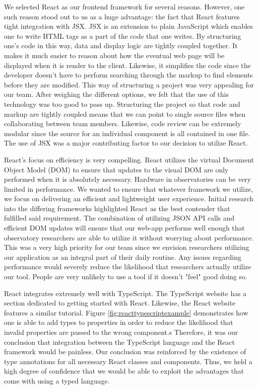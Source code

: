 \documentclass[12pt]{report}
\begin{document}
\begin{enumerate}
We selected React as our frontend framework for several reasons. However, one such reason stood out to us as a huge advantage: the fact that React features tight integration with JSX. JSX is an extension to plain JavaScript which enables one to write HTML tags as a part of the code that one writes. By structuring one's code in this way, data and display logic are tightly coupled together. It makes it much easier to reason about how the eventual web page will be displayed when it is render to the client. Likewise, it simplifies the code since the developer doesn't have to perform searching through the markup to find elements before they are modified. This way of structuring a project was very appealing for our team. After weighing the different options, we felt that the use of this technology was too good to pass up. Structuring the project so that code and markup are tightly coupled means that we can point to single source files when collaborating between team members. Likewise, code review can be extremely modular since the source for an individual component is all contained in one file. The use of JSX was a major contributing factor to our decision to utilize React.

React's focus on efficiency is very compelling. React utilizes the virtual Document Object Model (DOM) to ensure that updates to the visual DOM are only performed when it is absolutely necessary. Hardware in observatories can be very limited in performance. We wanted to ensure that whatever framework we utilize, we focus on delivering an efficient and lightweight user experience. Initial research into the differing frameworks highlighted React as the best contender that fulfilled said requirement. The combination of utilizing JSON API calls and efficient DOM updates will ensure that our web-app performs well enough that observatory researchers are able to utilize it without worrying about performance. This was a very high priority for our team since we envision researchers utilizing our application as an integral part of their daily routine. Any issues regarding performance would severely reduce the likelihood that researchers actually utilize our tool. People are very unlikely to use a tool if it doesn't "feel" good doing so.

React integrates extremely well with TypeScript. The TypeScript website has a section dedicated to getting started with React.\cite{typescriptreacttutorial} Likewise, the React website features a similar tutorial.\cite{reacttypescripttutorial} Figure \ref{fig:reacttypescriptexample} demonstrates how one is able to add types to properties in order to reduce the likelihood that invalid properties are passed to the wrong component.s Therefore, it was our conclusion that integration between the TypeScript language and the React framework would be painless. Our conclusion was reinforced by the existence of type annotations for all necessary React classes and components. Thus, we held a high degree of confidence that we would be able to exploit the advantages that come with using a typed language.


\end{enumerate}
\end{document}
